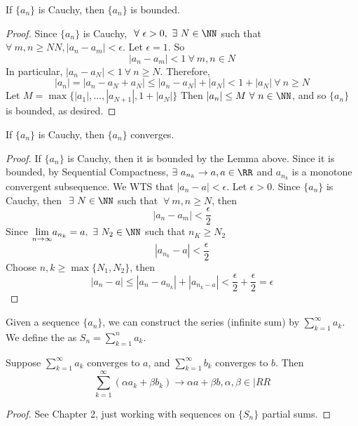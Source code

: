 \documentclass[12pt]{scrartcl}
\begin{document}
\begin{lemma}
  If $\{a_n\}$ is Cauchy, then $\{a_n\}$ is bounded. 

  \begin{proof}
    Since $\{a_n\}$ is Cauchy, $\ \forall \ \epsilon > 0, \ \exists \ N \in \NN$ such that 
    $\forall \ m, n \geq NN, |a_n - a_m| < \epsilon$. Let $\epsilon = 1$. So 
    \[|a_n - a_m| < 1 \ \forall \ m, n \in N\]
    In particular, $|a_n - a_N| < 1 \ \forall \ n \geq N$. Therefore, 
    \[|a_n| = |a_n - a_N + a_N| \leq |a_n - a_N| + |a_N| < 1 + |a_N| \ \forall \ n \geq N\]
    Let $M =\max\{|a_1|, \ldots, |a_{N+1}|, 1 + |a_N|\}$
    Then $|a_n| \leq M \ \forall \ n \in \NN$, and so $\{a_n\}$ is bounded, as desired.
  \end{proof}
\end{lemma}

\begin{theorem}
  If $\{a_n\}$ is Cauchy, then $\{a_n\}$ converges. 

  \begin{proof}
    If $\{a_n\}$ is Cauchy, then it is bounded by the Lemma above. Since it is bounded, by Sequential Compactness, 
    $\exists \ a_{n_k} \to a, a \in \RR$ and $a_{n_k}$ is a monotone convergent subsequence. We 
    WTS that $|a_n - a| < \epsilon$. Let $\epsilon > 0$. Since $\{a_n\}$ is Cauchy, then $\ \exists \ N \in \NN$ such that 
    $\ \forall \ m,n \geq N$, then 
    \[|a_n - a_m| < \frac{\epsilon}{2}\]
    Since $\underset{n\to\infty}{\lim} a_{n_k} = a, \ \exists \ N_2 \in \NN$ such that $n_K \geq N_2$
    \[|a_{n_k} - a| < \frac{\epsilon}{2}\]
    Choose $n, k \geq \max\{N_1, N_2\}$, then 
    \[|a_n - a| \leq |a_n - a_{n_k}| + |a_{n_k - a}| < \frac{\epsilon}{2} + \frac{\epsilon}{2} = \epsilon\]
  \end{proof}
\end{theorem}

\begin{definition}
  Given a sequence $\{a_n\}$, we can construct the series (infinite sum) by $\sum_{k=1}^\infty a_k$. We define the 
   as $S_n = \sum_{k=1}^n a_k$.
\end{definition}

\begin{theorem}
  Suppose $\sum_{k=1}^\infty a_k$ converges to $a$, and $\sum_{k=1}^\infty b_k$ converges to $b$. 
  Then 
  \[\sum_{k=1}^\infty (\alpha a_k + \beta b_k) \to \alpha a + \beta b, \alpha, \beta \in |RR\]
  \begin{proof}
    See Chapter 2, just working with sequences on $\{S_n\}$ partial sums.
  \end{proof}
\end{theorem}
\end{document}
